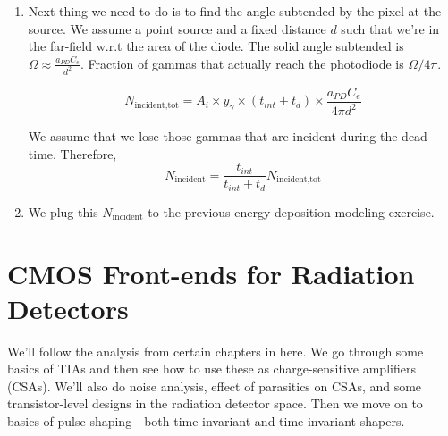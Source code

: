 \documentclass{article}
\begin{document}
\begin{enumerate}
\begin{table}[H]
\begin{center}
\begin{tabular}{|c|c|}
        \end{tabular}

        \end{center}
        

    \end{table}

    Let's assume we're operating in the regime of integration times where the RMS noise from the PD is `cancelled' by CDS. The only other noise sources are from the rest of the readout chain and we
    assume that to be a constant $v_{n,floor}$. Any gamma that needs to be detected needs to generate a signal above $v_{n,floor}$. In one frame, the total number of decays that lead to gamma emission is 
    $A_i \times y_\gamma \times (t_{int}+t_d)$. 

    \item Next thing we need to do is to find the angle subtended by the pixel at the source. We assume a point source and a fixed distance $d$ such that we're in the far-field w.r.t the area of the diode. 
    The solid angle subtended is $\Omega \approx \frac{a_{PD}C_e}{d^2}$. Fraction of gammas that actually reach the photodiode is $\Omega/4\pi$.

    \[N_{\text{incident,tot}} = A_i \times y_\gamma \times (t_{int}+t_d) \times \frac{a_{PD}C_e}{4\pi d^2} \]

    We assume that we lose those gammas that are incident during the dead time. Therefore, 
    \[N_{\text{incident}} = \frac{t_{int}}{t_{int}+t_d} N_{\text{incident,tot}}\]

    \item We plug this $N_{\text{incident}}$ to the previous energy deposition modeling exercise. 

\end{enumerate}





\pagebreak
\newpage

\section{CMOS Front-ends for Radiation Detectors}

We'll follow the analysis from certain chapters in \cite{Rivetti2015} here. We go through some basics of TIAs and then see how to use these as charge-sensitive amplifiers (CSAs).
We'll also do noise analysis, effect of parasitics on CSAs, and some transistor-level designs in the radiation detector space. Then we move on to basics of pulse shaping - both time-invariant and time-invariant shapers. 
\end{document}
